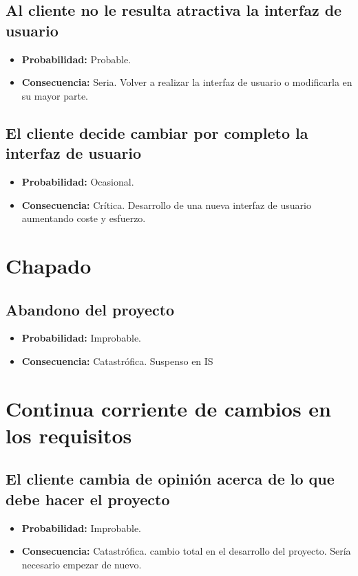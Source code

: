 \documentclass[spanish,a4paper,12pt]{report}	%
\begin{document}
\subsection*{Al cliente no le resulta atractiva la interfaz de usuario}
	\begin{itemize}
		\item \textbf {Probabilidad: }Probable.
		\item \textbf {Consecuencia: }Seria. Volver a realizar la interfaz de usuario o modificarla en su mayor parte.
	\end{itemize}

\subsection*{El cliente decide cambiar por completo la interfaz de usuario}
	\begin{itemize}
		\item \textbf {Probabilidad: }Ocasional.
		\item \textbf {Consecuencia: }Crítica. Desarrollo de una nueva interfaz de usuario aumentando coste y esfuerzo.
	\end{itemize}

%
\section{Chapado}

\subsection*{Abandono del proyecto}
	\begin{itemize}
		\item \textbf {Probabilidad: }Improbable.
		\item \textbf {Consecuencia: }Catastrófica. Suspenso en IS 	%
	\end{itemize}

%
\section{Continua corriente de cambios en los requisitos}

\subsection*{El cliente cambia de opinión acerca de lo que debe hacer el proyecto}
	\begin{itemize}
		\item \textbf {Probabilidad: }Improbable.
		\item \textbf {Consecuencia: }Catastrófica. cambio total en el desarrollo del proyecto. Sería necesario empezar de nuevo.
	\end{itemize}
\end{document}
